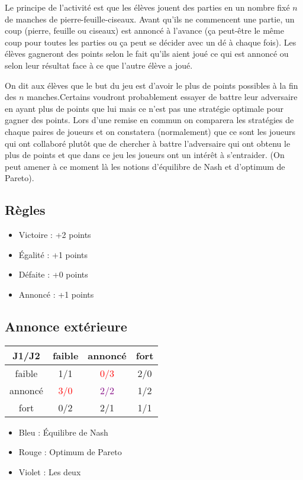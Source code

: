 \documentclass{article}
\begin{document}
Le principe de l'activité est que les élèves jouent des parties en un nombre fixé $n$ de manches de pierre-feuille-ciseaux. Avant qu'ils ne commencent une partie, un coup (pierre, feuille ou ciseaux) est annoncé à l'avance (ça peut-être le même coup pour toutes les parties ou ça peut se décider avec un dé à chaque fois). Les élèves gagneront des points selon le fait qu'ils aient joué ce qui est annoncé ou selon leur résultat face à ce que l'autre élève a joué.

On dit aux élèves que le but du jeu est d'avoir le plus de points possibles à la fin des $n$ manches.Certains voudront probablement essayer de battre leur adversaire en ayant plus de points que lui mais ce n'est pas une stratégie optimale pour gagner des points. Lors d'une remise en commun on comparera les stratégies de chaque paires de joueurs et on constatera (normalement) que ce sont les joueurs qui ont collaboré plutôt que de chercher à battre l'adversaire qui ont obtenu le plus de points et que dans ce jeu les joueurs ont un intérêt à s'entraider. (On peut amener à ce moment là les notions d'équilibre de Nash et d'optimum de Pareto).

\subsection{Règles}
\begin{itemize}
    \item Victoire : +2 points
    \item Égalité : +1 points
    \item Défaite : +0 points
    \item Annoncé : +1 points
\end{itemize}

\subsection{Annonce extérieure}
\begin{tabular}{c|c|c|c}
    J1/J2 & faible & annoncé & fort \\ \hline
    faible & 1/1 & \textcolor{red}{0/3} & 2/0  \\ \hline
    annoncé & \textcolor{red}{3/0} & \textcolor{purple}{2/2} & 1/2 \\ \hline
    fort & 0/2 & 2/1 & 1/1 
\end{tabular}

\begin{itemize}
    \item Bleu : Équilibre de Nash
    \item Rouge : Optimum de Pareto
    \item Violet : Les deux
\end{itemize}
\end{document}
